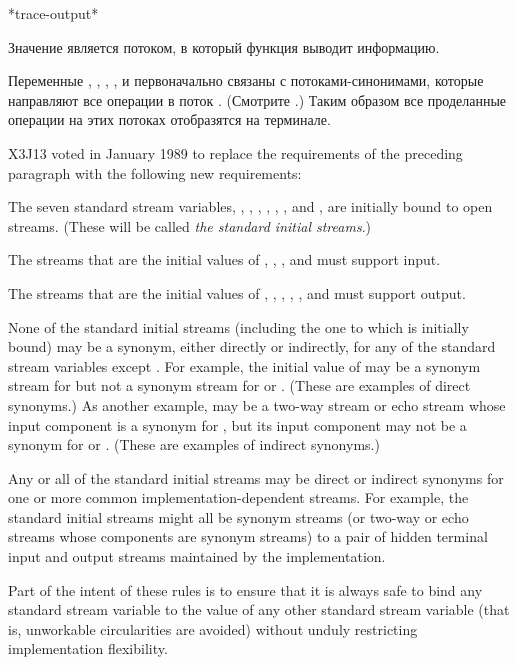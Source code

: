 \begin{defun}[Переменная]
*trace-output*

Значение  является потоком, в который функция 
выводит информацию.
\end{defun}

Переменные , ,
,
,
 и 
первоначально связаны с потоками-синонимами, которые направляют все операции в
поток .
(Смотрите .)
Таким образом все проделанные операции на этих потоках отобразятся на терминале.

\begin{new}
X3J13 voted in January 1989
to replace the requirements of the preceding
paragraph with the following new requirements:

The seven standard stream variables,
, , ,
, ,
, and
,
are initially bound to open streams.  (These will be called
\emph{the standard initial streams}.)

The streams that are the initial values of
, , , and 
must support input.

The streams that are the initial values of
,
,
, , , and 
must support output.

None of the standard initial streams (including the one to which
 is initially bound) may be a synonym, either directly
or indirectly, for any of the standard stream variables
except .  For example, the initial value of
 may be a synonym stream for 
but not a synonym stream for  or .
(These are examples of direct synonyms.)  As another example,
 may be a two-way stream or echo stream whose
input component is a synonym for ,
but its input component may not be a synonym for 
or .  (These are examples of indirect synonyms.)

Any or all of the standard initial streams may be direct or indirect
synonyms for one or more common implementation-dependent streams.
For example, the standard initial streams might all be synonym streams
(or two-way or echo streams whose components are synonym streams)
to a pair of hidden terminal input and output streams maintained by
the implementation.

Part of the intent of these rules is to ensure that it is always safe
to bind any standard stream variable to the value of any other
standard stream variable (that is, unworkable circularities are
avoided) without unduly restricting implementation flexibility.
\end{new}

